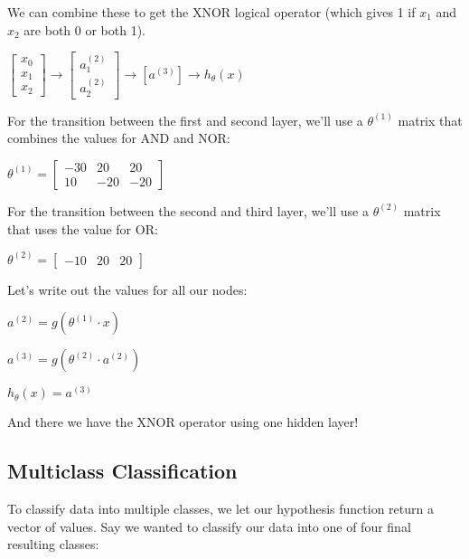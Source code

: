 \documentclass{article}
\begin{document}
We can combine these to get the XNOR logical operator (which gives 1 if $x_1$ and $x_2$ are both 0 or both 1).

$\left[\begin{matrix}
x_0 \\
x_1 \\
x_2
\end{matrix}\right]
\to
\left[ \begin{matrix}
a_1^{(2)} \\
a_2^{(2)}
\end{matrix}\right]
\to
\left[a^{(3)} \right]
\to 
h_{\theta}(x)
$

For the transition between the first and second layer, we'll use a $\theta^{(1)}$ matrix that combines the values for AND and NOR:

$\theta^{(1)}=
\left[\begin{matrix}
−30 & 20 & 20 \\
10  &−20 &−20
\end{matrix}\right]
$

For the transition between the second and third layer, we'll use a $\theta^{(2)}$ matrix that uses the value for OR:

$\theta^{(2)}=\left[\begin{matrix}−10 & 20 &20\end{matrix}\right]$

Let's write out the values for all our nodes:

$a^{(2)}=g(\theta^{(1)}\cdot x)$

$a^{(3)}=g(\theta^{(2)} \cdot a^{(2)})$

$h_\theta(x)=a^{(3)}$

And there we have the XNOR operator using one hidden layer!
\subsection{Multiclass Classification}

To classify data into multiple classes, we let our hypothesis function return a vector of values. Say we wanted to classify our data into one of four final resulting classes:
\end{document}
